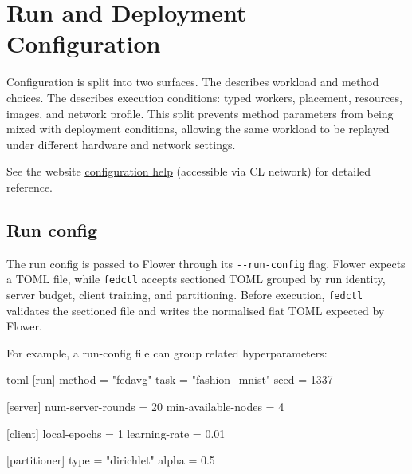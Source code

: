 \FloatBarrier
\section{Run and Deployment Configuration}
\label{sec:impl_configuration}

Configuration is split into two surfaces. The  \runconf{} describes workload and method choices. The  \deployconf{} describes execution conditions: typed workers, placement, resources, images, and network profile.  This split prevents method parameters from being mixed with deployment conditions, allowing the same workload to be replayed under different hardware and network settings.

See the website \href{http://fedctl.cl.cam.ac.uk/help\#configs}{\underline{configuration help}} (accessible via CL network) for detailed reference.

\FloatBarrier
\subsection[Run config]{Run config }

The run config is passed to Flower through its \verb|--run-config| flag. Flower expects a TOML file, while \texttt{fedctl} accepts sectioned TOML grouped by run identity, server budget, client training, and partitioning. Before execution, \texttt{fedctl} validates the sectioned file and writes the normalised flat TOML expected by Flower.

For example, a run-config file can group related hyperparameters:

\begin{codeblock}{toml}
[run]
method = "fedavg"
task = "fashion_mnist"
seed = 1337

[server]
num-server-rounds = 20
min-available-nodes = 4

[client]
local-epochs = 1
learning-rate = 0.01

[partitioner]
type = "dirichlet"
alpha = 0.5
\end{codeblock}


